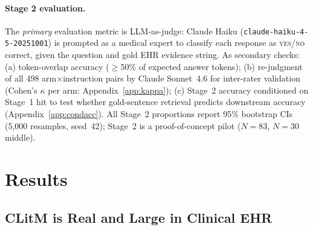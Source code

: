 \documentclass{article}
\begin{document}
\paragraph{Stage 2 evaluation.} The \emph{primary} evaluation metric is
LLM-as-judge: Claude Haiku (\texttt{claude-haiku-4-5-20251001}) is prompted
as a medical expert to classify each response as \textsc{yes}/\textsc{no}
correct, given the question and gold EHR evidence string. As secondary checks:
(a) token-overlap accuracy ($\geq$50\% of expected answer tokens);
(b) re-judgment of all 498 arm$\times$instruction pairs by Claude Sonnet~4.6
for inter-rater validation (Cohen's $\kappa$ per arm: Appendix~\ref{app:kappa});
(c) Stage~2 accuracy conditioned on Stage~1 hit to test whether gold-sentence
retrieval predicts downstream accuracy (Appendix~\ref{app:condacc}).
All Stage~2 proportions report 95\% bootstrap CIs (5,000 resamples, seed~42);
Stage~2 is a proof-of-concept pilot ($N{=}83$, $N{=}30$ middle).

\section{Results}
\label{sec:results}

\subsection{CLitM is Real and Large in Clinical EHR}
\end{document}
